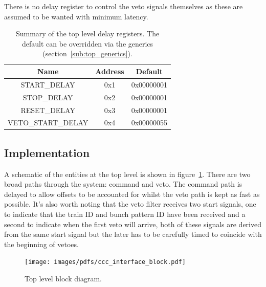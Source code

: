 There is no delay register to control the veto signals themselves as these are assumed to be wanted with minimum latency.
    
\begin{table}[htbp]
  \begin{center}
    \begin{tabular}{c | c | c }
      Name               & Address & Default    \\
      \hline
      START\_DELAY       & 0x1     & 0x00000001 \\
      STOP\_DELAY        & 0x2     & 0x00000001 \\
      RESET\_DELAY       & 0x3     & 0x00000001 \\
      VETO\_START\_DELAY & 0x4     & 0x00000055 \\
    \end{tabular}
  \end{center}
  \caption{Summary of the top level delay registers. The default can be overridden via the generics (section~\ref{sub:top_generics}).}
  \label{tab:delay_regs}
\end{table}
\subsection{Implementation} %
\label{sub:top_implementation}
A schematic of the entities at the top level is shown in figure~\ref{fig:ccc_interface_entity}. There are two broad paths through the system: command and veto. The command path is delayed to allow offsets to be accounted for whilst the veto path is kept as fast as possible. It's also worth noting that the veto filter receives two start signals, one to indicate that the train ID and bunch pattern ID have been received and a second to indicate when the first veto will arrive, both of these signals are derived from the same start signal but the later has to be carefully timed to coincide with the beginning of vetoes.
    
\begin{figure}[htbp]
  \centering
  \texttt{[image: images/pdfs/ccc\_interface\_block.pdf]}
  \caption{Top level block diagram.}
  \label{fig:ccc_interface_entity}
\end{figure}
    
